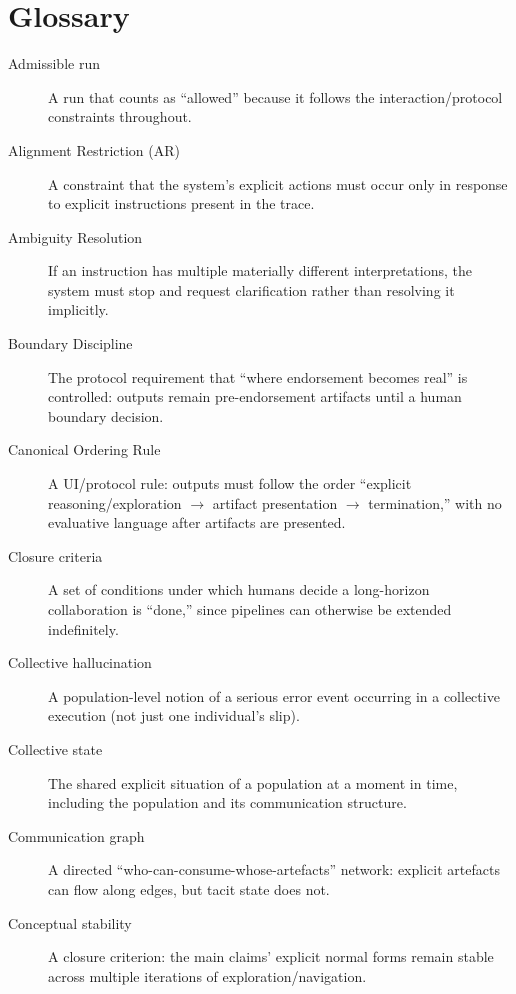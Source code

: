 \chapter{Glossary}
\label{ch:glossary}
\begin{description}

\item[Admissible run] A run that counts as “allowed” because it follows the interaction/protocol constraints throughout.

\item[Alignment Restriction (AR)] A constraint that the system’s explicit actions must occur only in response to explicit instructions present in the trace.

\item[Ambiguity Resolution] If an instruction has multiple materially different interpretations, the system must stop and request clarification rather than resolving it implicitly.

\item[Boundary Discipline] The protocol requirement that “where endorsement becomes real” is controlled: outputs remain pre-endorsement artifacts until a human boundary decision.

\item[Canonical Ordering Rule] A UI/protocol rule: outputs must follow the order “explicit reasoning/exploration $\rightarrow$ artifact presentation $\rightarrow$ termination,” with no evaluative language after artifacts are presented.

\item[Closure criteria] A set of conditions under which humans decide a long-horizon collaboration is “done,” since pipelines can otherwise be extended indefinitely.

\item[Collective hallucination] A population-level notion of a serious error event occurring in a collective execution (not just one individual’s slip).

\item[Collective state] The shared explicit situation of a population at a moment in time, including the population and its communication structure.

\item[Communication graph] A directed “who-can-consume-whose-artefacts” network: explicit artefacts can flow along edges, but tacit state does not.

\item[Conceptual stability] A closure criterion: the main claims’ explicit normal forms remain stable across multiple iterations of exploration/navigation.


\end{description}
